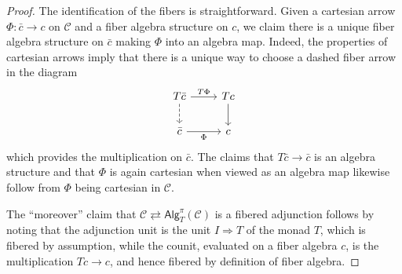 \documentclass[a4paper,10pt
,draft
]{article}%
\numberwithin{equation}{section}
\numberwithin{figure}{section}
\theoremstyle{definition} %
\newcommand{\1}{\ensuremath{\mathbbm 1}}%
\begin{document}
\begin{proof}
        The identification of the fibers is straightforward.
	Given a cartesian arrow $\Phi \colon \bar{c} \to c$ on $\mathcal{C}$ and a fiber algebra structure on $c$, we claim there is a unique fiber algebra structure on $\bar{c}$ making $\Phi$ into an algebra map. Indeed, the properties of cartesian arrows imply that there is a unique way to choose a dashed fiber arrow in the diagram
	\[
	\begin{tikzcd}
	T \bar{c} \ar{r}{T \Phi} \ar[dashed]{d} & T c \ar{d}
	\\
	\bar{c} \ar{r}[swap]{\Phi} & c
	\end{tikzcd}
	\]
	which provides the multiplication on $\bar{c}$.
	The claims that $T\bar{c} \to \bar{c}$ is an algebra structure and that 
	$\Phi$ is again cartesian when viewed as an algebra map likewise follow from 
	$\Phi$ being cartesian in $\mathcal{C}$.
	
	The ``moreover'' claim that 
	$\mathcal{C} \rightleftarrows \mathsf{Alg}^{\pi}_T(\mathcal{C})$
	is a fibered adjunction
	follows by noting that the adjunction unit is the unit
	$I \Rightarrow T$ of the monad $T$, 
	which is fibered by assumption,
	while the counit, evaluated on a fiber algebra $c$, is the multiplication $Tc \to c$, and hence fibered by definition of fiber algebra.
\end{proof}
\end{document}
